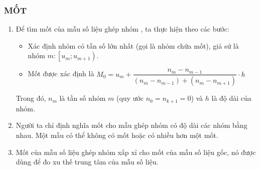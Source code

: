 	\subsubsection{MỐT}
\begin{enumerate}[\iconMT]
	\item {} Để tìm mốt của mẫu số liệu ghép nhóm , ta thực hiện theo các bước:
	\begin{tcolorbox}[colframe=cyan,colback=red!3!white,boxrule=0.5mm]
		\begin{itemize}
			\item {} Xác định nhóm có tần số lớn nhất (gọi là nhóm chứa mốt), giả sử là nhóm $m:\left[u_m;u_{m+1} \right)$.
			\item {} Mốt được xác định là $M_0=u_m+\dfrac{n_m-n_{m-1}}{\left(n_m-n_{m-1}\right)+\left(n_m-n_{m+1}\right)} \cdot h$
		\end{itemize}
		Trong đó, $n_m$ là tần số nhóm $m$ (quy ước $n_0=n_{k+1}=0$) và $h$ là độ dài của nhóm.	
	\end{tcolorbox}
	\item {} Người ta chỉ định nghĩa mốt cho mẫu ghép nhóm có độ dài các nhóm bằng nhau. Một mẫu có thể không có mốt hoặc có nhiều hơn một mốt.	
	\item {} Mốt của mẫu số liệu ghép nhóm xấp xỉ cho mốt của mẫu số liệu gốc, nó được dùng để đo xu thế trung tâm của mẫu số liệu.
\end{enumerate}

